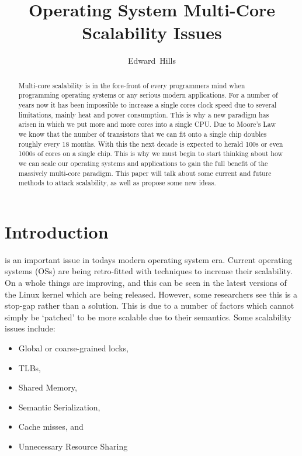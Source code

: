 \documentclass[journal]{IEEEtran}
\begin{document}
\title{Operating System Multi-Core Scalability Issues}

\author{Edward~Hills}

\maketitle

\begin{abstract}

Multi-core scalability is in the fore-front of every programmers mind when programming operating systems or any serious modern applications. For a number of years now it has been impossible to increase a single cores clock speed due to several limitations, mainly heat and power consumption. This is why a new paradigm has arisen in which we put more and more cores into a single CPU. Due to Moore's Law we know that the number of transistors that we can fit onto a single chip doubles roughly every 18 months. With this the next decade is expected to herald 100s or even 1000s of cores on a single chip. This is why we must begin to start thinking about how we can scale our operating systems and applications to gain the full benefit of the massively multi-core paradigm. This paper will talk about some current and future methods to attack scalability, as well as propose some new ideas.

\end{abstract}

\section{Introduction}
 is an important issue in todays modern operating system era. Current operating systems (OSs) are being retro-fitted with techniques to increase their scalability. On a whole things are improving, and this can be seen in the latest versions of the Linux kernel which are being released. However, some researchers see this is a stop-gap rather than a solution. This is due to a number of factors which cannot simply be `patched' to be more scalable due to their semantics. Some scalability issues include:

\vspace{2mm}

\begin{itemize}
\item Global or coarse-grained locks,
\item TLBs,
\item Shared Memory,
\item Semantic Serialization,
\item Cache misses, and
\item Unnecessary Resource Sharing
\end{itemize}
\end{document}
